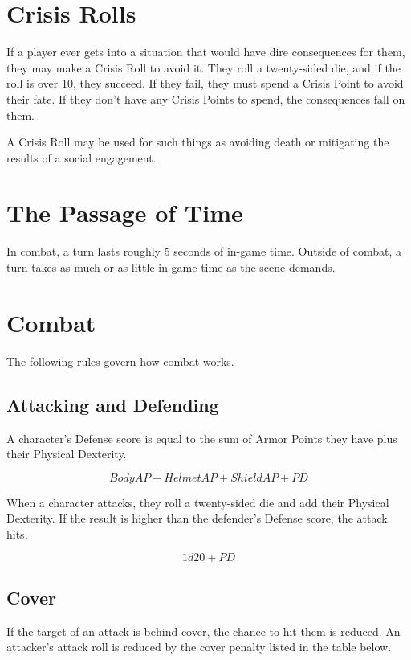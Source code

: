 \begin{multicols}{2}
\section{Crisis Rolls}

If a player ever gets into a situation that would have dire
consequences for them, they may make a Crisis Roll to avoid it.
They roll a twenty-sided die, and if the roll is over 10, they
succeed. If they fail, they must spend a Crisis Point to avoid
their fate. If they don't have any Crisis Points to spend, the
consequences fall on them.

A Crisis Roll may be used for such things as avoiding death or
mitigating the results of a social engagement.

\section{The Passage of Time}

In combat, a turn lasts roughly 5 seconds of in-game time. Outside
of combat, a turn takes as much or as little in-game time as the
scene demands.

\section{Combat}

The following rules govern how combat works.

\subsection{Attacking and Defending}

A character's Defense score is equal to the sum of Armor Points they have plus
their Physical Dexterity.

$$Body AP + Helmet AP + Shield AP + PD$$

When a character attacks, they roll a twenty-sided die and add their Physical
Dexterity. If the result is higher than the defender's Defense score, the attack hits.

$$1d20 + PD$$

\subsection{Cover}

If the target of an attack is behind cover, the chance to hit them is reduced.
An attacker's attack roll is reduced by the cover penalty listed in the table
below.


\end{multicols}
